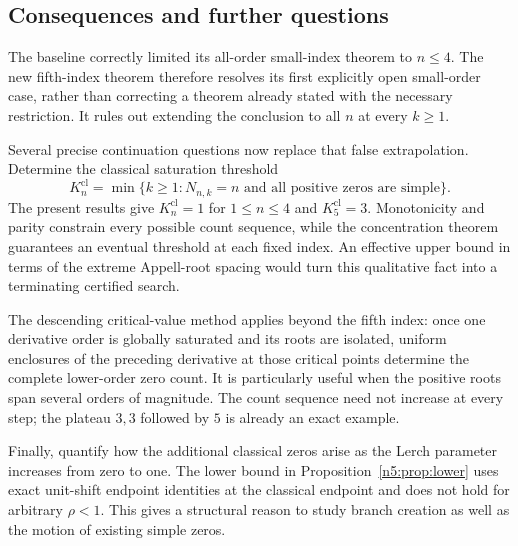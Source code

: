 \subsection{Consequences and further questions}

The baseline correctly limited its all-order small-index theorem to
$n\leq4$.  The new fifth-index theorem therefore resolves its first
explicitly open small-order case, rather than correcting a theorem
already stated with the necessary restriction.  It rules out extending
the conclusion to all $n$ at every $k\geq1$.

Several precise continuation questions now replace that false
extrapolation.  Determine the classical saturation threshold
\[
 K_n^{\mathrm{cl}}=
   \min\{k\geq1:N_{n,k}=n\text{ and all positive zeros are simple}\}.
\]
The present results give $K_n^{\mathrm{cl}}=1$ for $1\leq n\leq4$
and $K_5^{\mathrm{cl}}=3$.  Monotonicity and parity constrain every
possible count sequence, while the concentration theorem guarantees an
eventual threshold at each fixed index.  An effective upper bound in
terms of the extreme Appell-root spacing would turn this qualitative
fact into a terminating certified search.

The descending critical-value method applies beyond the fifth index:
once one derivative order is globally saturated and its roots are
isolated, uniform enclosures of the preceding derivative at those
critical points determine the complete lower-order zero count.  It is
particularly useful when the positive roots span several orders of
magnitude.  The count sequence need not increase at every step; the
plateau $3,3$ followed by $5$ is already an exact example.

Finally, quantify how the additional classical zeros arise as the Lerch
parameter increases from zero to one.  The lower bound in
Proposition~\ref{n5:prop:lower} uses exact unit-shift endpoint identities
at the classical endpoint and does not hold for arbitrary $\rho<1$.
This gives a structural reason to study branch creation as well as the
motion of existing simple zeros.
